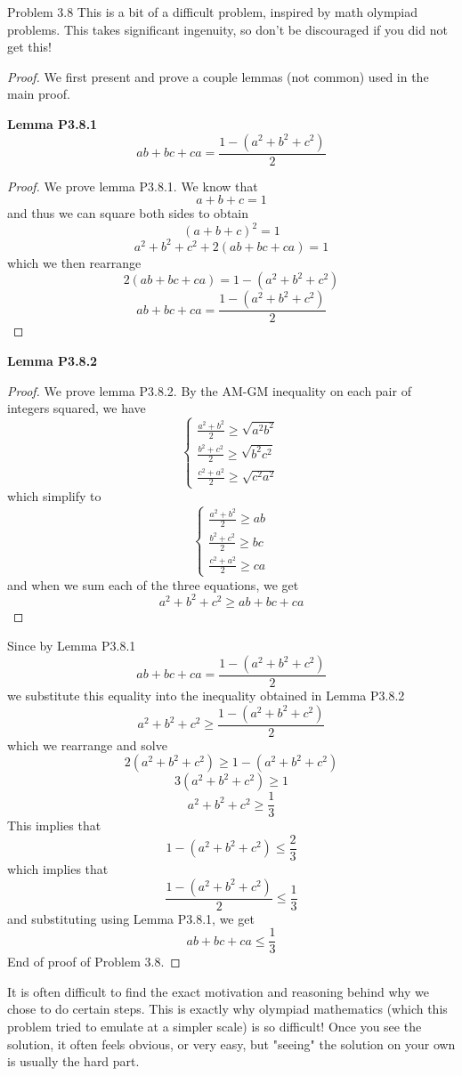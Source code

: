 \begin{sol}{Problem 3.8}
This is a bit of a difficult problem, inspired by math olympiad problems. This takes significant ingenuity, so don't be discouraged if you did not get this!
\begin{proof}
We first present and prove a couple lemmas (not common) used in the main proof.

\textbf{Lemma P3.8.1}
\[
ab + bc + ca = \frac{1 - (a^2 + b^2 + c^2)}{2}
\]
\begin{proof}
We prove lemma P3.8.1. We know that 
\[
a + b + c = 1
\]
and thus we can square both sides to obtain
\[
(a+b+c)^2 = 1
\]
\[
a^2 + b^2 + c^2 + 2(ab + bc + ca) = 1
\]
which we then rearrange 
\[
2(ab + bc + ca) = 1 - (a^2 + b^2 + c^2)
\]
\[
ab + bc + ca = \frac{1 - (a^2 + b^2 + c^2)}{2}
\]
\end{proof}

\textbf{Lemma P3.8.2}
\begin{proof}
We prove lemma P3.8.2. 
By the AM-GM inequality on each pair of integers squared, we have 
\[
\begin{cases}
\frac{a^2 + b^2}{2} \geq \sqrt{a^2b^2} \\
\frac{b^2 + c^2}{2} \geq \sqrt{b^2c^2} \\
\frac{c^2 + a^2}{2} \geq \sqrt{c^2a^2}
\end{cases}
\]
which simplify to
\[
\begin{cases}
\frac{a^2 + b^2}{2} \geq ab \\
\frac{b^2 + c^2}{2} \geq bc \\
\frac{c^2 + a^2}{2} \geq ca
\end{cases}
\]
and when we sum each of the three equations, we get
\[
a^2 + b^2 + c^2 \geq ab + bc + ca
\]
\end{proof}
Since by Lemma P3.8.1
\[
ab + bc + ca = \frac{1 - (a^2 + b^2 + c^2)}{2}
\]
we substitute this equality into the inequality obtained in Lemma P3.8.2
\[
a^2 + b^2 + c^2 \geq \frac{1 - (a^2 + b^2 + c^2)}{2}
\]
which we rearrange and solve
\[
2(a^2 + b^2 + c^2) \geq 1 - (a^2 + b^2 + c^2)
\]
\[
3(a^2 + b^2 + c^2) \geq 1
\]
\[
a^2 + b^2 + c^2 \geq \frac{1}{3}
\]
This implies that 
\[
1 - (a^2 + b^2 + c^2) \leq \frac{2}{3}
\]
which implies that
\[
\frac{1 - (a^2 + b^2 + c^2)}{2} \leq \frac{1}{3}
\]
and substituting using Lemma P3.8.1, we get
\[
ab + bc + ca \leq \frac{1}{3}
\]
End of proof of Problem 3.8.
\end{proof}

It is often difficult to find the exact motivation and reasoning behind why we chose to do certain steps. This is exactly why olympiad mathematics (which this problem tried to emulate at a simpler scale) is so difficult! Once you see the solution, it often feels obvious, or very easy, but "seeing" the solution on your own is usually the hard part.
\end{sol}

